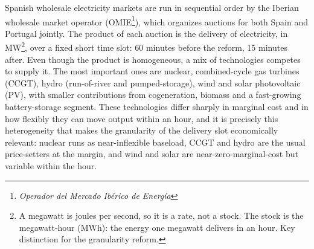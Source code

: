\documentclass[11pt,a4paper]{article}
\theoremstyle{definition}
\theoremstyle{remark}
\theoremstyle{plain}
\begin{document}
Spanish wholesale electricity markets are run in sequential order by the Iberian wholesale market operator (OMIE\footnote{\textit{Operador del Mercado Ibérico de Energía}}), which organizes auctions for both Spain and Portugal jointly. The product of each auction is the delivery of electricity, in MW\footnote{A megawatt is joules per second, so it is a rate, not a stock. The stock is the megawatt-hour (MWh): the energy one megawatt delivers in an hour. Key distinction for the granularity reform.}, over a fixed short time slot: 60 minutes before the reform, 15 minutes after. Even though the product is homogeneous, a mix of technologies competes to supply it. The most important ones are nuclear, combined-cycle gas turbines (CCGT), hydro (run-of-river and pumped-storage), wind and solar photovoltaic (PV), with smaller contributions from cogeneration, biomass and a fast-growing battery-storage segment. These technologies differ sharply in marginal cost and in how flexibly they can move output within an hour, and it is precisely this heterogeneity that makes the granularity of the delivery slot economically relevant: nuclear runs as near-inflexible baseload, CCGT and hydro are the usual price-setters at the margin, and wind and solar are near-zero-marginal-cost but variable within the hour.
\end{document}
